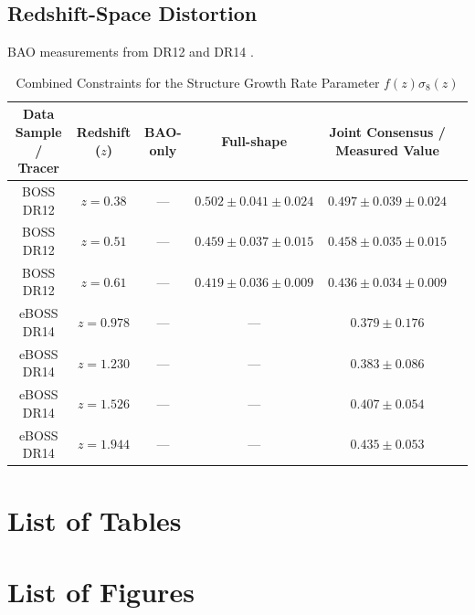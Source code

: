 \documentclass{book}
\begin{document}
	\section{Redshift-Space Distortion}
	BAO measurements from DR12 \cite{Alam_2017} and DR14 \cite{Zhao_2018}.
	\begin{table}[h!]
		\centering
		\footnotesize
		\begin{tabular}{cccccc}
			\hline\hline
			Data Sample / Tracer & Redshift ($z$) & BAO-only & Full-shape & Joint Consensus / Measured Value \\ \hline
			BOSS DR12   & $z = 0.38$  & — & $0.502 \pm 0.041 \pm 0.024$ & $0.497 \pm 0.039 \pm 0.024$ \\
			BOSS DR12   & $z = 0.51$  & — & $0.459 \pm 0.037 \pm 0.015$ & $0.458 \pm 0.035 \pm 0.015$ \\
			BOSS DR12   & $z = 0.61$  & — & $0.419 \pm 0.036 \pm 0.009$ & $0.436 \pm 0.034 \pm 0.009$ \\
			eBOSS DR14  & $z = 0.978$ & — & — & $0.379 \pm 0.176$ \\
			eBOSS DR14  & $z = 1.230$ & — & — & $0.383 \pm 0.086$ \\
			eBOSS DR14  & $z = 1.526$ & — & — & $0.407 \pm 0.054$ \\
			eBOSS DR14  & $z = 1.944$ & — & — & $0.435 \pm 0.053$ \\ \hline\hline
		\end{tabular}
		\normalsize
		\caption{Combined Constraints for the Structure Growth Rate Parameter $f(z)\sigma_8(z)$}
		\label{tab:BAO_f8_final}
	\end{table}
	
	\chapter{List of Tables}
	\chapter{List of Figures}
	
		

	
\end{document}
